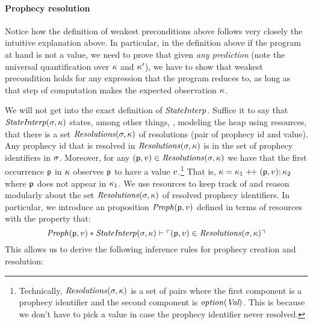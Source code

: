 \documentclass{article}
\begin{document}
\paragraph{Prophecy resolution}
Notice how the definition of weakest preconditions above follows very
closely the intuitive explanation above. In particular, in the
definition above if the program at hand is not a value, we need to
prove that given \emph{any prediction} (note the universal
quantification over $\kappa$ and $\kappa'$), we have to
show that weakest precondition holds for any expression that the
program reduces to, as long as that step of computation makes the
expected observation $\kappa$.

We will not get into the exact definition of $\mathit{StateInterp}$. Suffice
it to say that $\mathit{StateInterp}(\sigma, \kappa)$ states, among
other things, \eg, modeling the heap using \Iris{} resources, that
there is a set $\mathit{Resolutions}(\sigma, \kappa)$ of resolutions
(pair of prophecy id and value). Any prophecy id that is resolved in
$\mathit{Resolutions}(\sigma, \kappa)$ is in the set of prophecy
identifiers in $\sigma$. Moreover, for any
$(\mathsf{p}, v) \in \mathit{Resolutions}(\sigma, \kappa)$ we have that
the first occurrence $\mathsf{p}$ in $\kappa$ observes $\mathsf{p}$ to
have a value $v$.\footnote{Technically,
  $\mathit{Resolutions}(\sigma, \kappa)$ is a set of pairs where the
  first component is a prophecy identifier and the second component is
  $\mathit{option}(\textit{Val})$. This is because we don't have to pick a
  value in case the prophecy identifier never resolved. } That is,
$\kappa = \kappa_1 \mathrel{+\!+} (\mathsf{p}, v); \kappa_2$
where $\mathsf{p}$ does not appear in $\kappa_1$. We use \Iris{}
resources to keep track of and reason modularly about the set
$\mathit{Resolutions}(\sigma, \kappa)$ of resolved prophecy
identifiers. In particular, we introduce an \Iris{} proposition
$\mathit{Proph}(\mathsf{p}, v)$ defined in terms of \Iris{} resources with
the property that:
\[
  \mathit{Proph}(\mathsf{p}, v) \ast \mathit{StateInterp}(\sigma, \kappa)
  \vdash \ulcorner (\mathsf{p}, v) \in \mathit{Resolutions}(\sigma,
    \kappa) \urcorner
\]
This allows us to derive the following inference rules for prophecy
creation and resolution:
\end{document}
